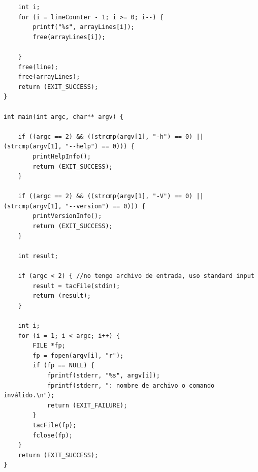 \documentclass[a4paper,11pt]{article}
\begin{document}
\begin{lstlisting}
    int i;
    for (i = lineCounter - 1; i >= 0; i--) {
        printf("%s", arrayLines[i]);
        free(arrayLines[i]);

    }
    free(line);
    free(arrayLines);
    return (EXIT_SUCCESS);
}

int main(int argc, char** argv) {

    if ((argc == 2) && ((strcmp(argv[1], "-h") == 0) || (strcmp(argv[1], "--help") == 0))) {
        printHelpInfo();
        return (EXIT_SUCCESS);
    }

    if ((argc == 2) && ((strcmp(argv[1], "-V") == 0) || (strcmp(argv[1], "--version") == 0))) {
        printVersionInfo();
        return (EXIT_SUCCESS);
    }

    int result;

    if (argc < 2) { //no tengo archivo de entrada, uso standard input
        result = tacFile(stdin);
        return (result);
    }

    int i;
    for (i = 1; i < argc; i++) {
        FILE *fp;
        fp = fopen(argv[i], "r");
        if (fp == NULL) {
            fprintf(stderr, "%s", argv[i]);
            fprintf(stderr, ": nombre de archivo o comando inválido.\n");
            return (EXIT_FAILURE);
        }
        tacFile(fp);
        fclose(fp);
    }
    return (EXIT_SUCCESS);
}

\end{lstlisting}
\end{document}
